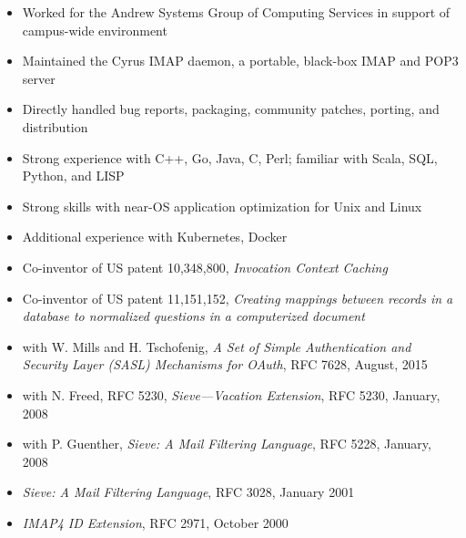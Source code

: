 \documentclass[letterpaper,11pt,twoside]{article}
\begin{document}
\vspace{-14pt}
\begin{itemize}
\item Worked for the Andrew Systems Group of Computing Services in
  support of campus-wide environment
\item Maintained the Cyrus IMAP daemon, a portable, black-box IMAP and
  POP3 server
\item Directly handled bug reports, packaging, community patches,
  porting, and distribution
\end{itemize}

\pagebreak

\vspace{2pt}

\vspace{-6pt}
\begin{itemize}
\item Strong experience with C++, Go, Java, C, Perl; familiar with
  Scala, SQL, Python, and LISP
\item Strong skills with near-OS application optimization for Unix and Linux
\item Additional experience with Kubernetes, Docker
\end{itemize}

\vspace{-6pt}
\begin{itemize}
\item Co-inventor of US patent 10,348,800, {\sl Invocation Context Caching}
\item Co-inventor of US patent 11,151,152, {\sl Creating mappings between
    records in a database to normalized questions in a computerized document}
\item with W. Mills and H. Tschofenig, {\sl A Set of Simple Authentication and
  Security Layer (SASL) Mechanisms for OAuth}, RFC 7628, August, 2015
\item with N. Freed, RFC 5230, {\sl Sieve---Vacation Extension}, RFC
  5230, January, 2008
\item with P. Guenther, {\sl Sieve: A Mail Filtering Language}, RFC
  5228, January, 2008
\item {\sl Sieve: A Mail Filtering Language}, RFC 3028, January 2001
\item {\sl IMAP4 ID Extension}, RFC 2971, October 2000
\end{itemize}
\end{document}
